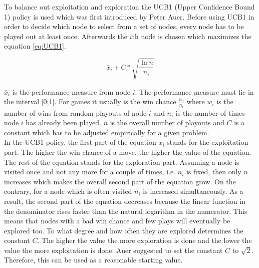\documentclass[english]{report} \usepackage[english]{babel}
\begin{document}
To balance out exploitation and exploration the UCB1 (Upper Confidence Bound 1)
policy is used which was first introduced by Peter Auer.\cite{paper:ucb1}
Before using UCB1 in order to decide which node to select from a set of nodes,
every node has to be played out at least once. Afterwards the \(i\)th node is
chosen which maximizes the equation \ref{eq:UCB1}.

\begin{equation}
\label{eq:UCB1}
\bar{x}_{i} + C * \sqrt{\frac{\ln n}{n_{i}}}
\end{equation}

\(\bar{x}_{i}\) is the performance measure from node \(i\). The performance measure
must lie in the interval [0;1]. For games it usually is the win chance
\(\frac{w_{i}}{n_{i}}\) where \(w_{i}\) is the number of wins from random
playouts of node \(i\) and \(n_{i}\) is the number of times node \(i\) has
already been played. \(n\) is the overall number of playouts and \(C\) is a
constant which has to be adjusted empirically for a given problem.\cite{thesis:uct}\\


In the UCB1 policy, the first part of the equation \(\bar{x}_{i}\) stands for the
exploitation part. The higher the win chance of a move, the higher the value of
the equation. The rest of the equation stands for the exploration part. Assuming
a node is visited once and not any more for a couple of times, i.e. \(n_{i}\) is
fixed, then only \(n\) increases which makes the overall second part of the
equation grow. On the contrary, for a node which is often visited \(n_{i}\) is
increased simultaneously. As a result, the second part of the equation decreases
because the linear function in the denominator rises faster than the natural
logarithm in the numerator. This means that nodes with a bad win chance and few
plays will eventually be explored too. To what degree and how often they are
explored determines the constant \(C\). The higher the value the more
exploration is done and the lower the value the more exploitation is done.
Auer suggested to set the constant \(C\) to
\(\sqrt{2}\).\cite{paper:ucb1} Therefore, this can be used as a
reasonable starting value.\\
\end{document}

